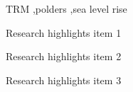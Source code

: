 \begin{keywords}
  TRM \sep polders \sep sea level rise
\end{keywords}

\begin{highlights}
  \item Research highlights item 1
  \item Research highlights item 2
  \item Research highlights item 3
\end{highlights}

\maketitle